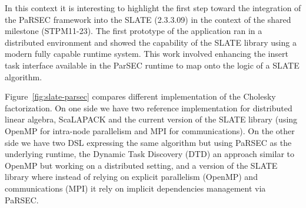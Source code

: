 In this context it is interesting to highlight the first step toward
the integration of the PaRSEC framework into the SLATE (2.3.3.09) in
the context of the shared milestone (STPM11-23). The first prototype
of the application ran in a distributed environment and showed the
capability of the SLATE library using a modern fully capable runtime
system. This work involved enhancing the insert task interface
available in the ParSEC runtime to map onto the logic of a SLATE
algorithm.

Figure~\ref{fig:slate-parsec} compares different implementation of the
Cholesky factorization. On one side we have two reference
implementation for distributed linear algebra, ScaLAPACK and the
current version of the SLATE library (using OpenMP for intra-node
parallelism and MPI for communications). On the other side we have two
DSL expressing the same algorithm but using PaRSEC as the underlying
runtime, the Dynamic Task Discovery (DTD) an approach similar to
OpenMP but working on a distributed setting, and a version of the
SLATE library where instead of relying on explicit parallelism
(OpenMP) and communications (MPI) it rely on implicit dependencies
management via PaRSEC.



%
%


